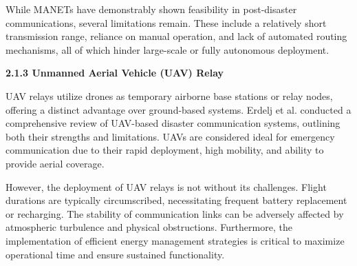             While MANETs have demonstrably shown feasibility in post-disaster communications, several limitations remain. These include a relatively short transmission range, reliance on manual operation, and lack of automated routing mechanisms, all of which hinder large-scale or fully autonomous deployment.

        \vspace{1em}
        \noindent\textbf{2.1.3 Unmanned Aerial Vehicle (UAV) Relay}\par
        \vspace{0.2em}
            UAV relays utilize drones as temporary airborne base stations or relay nodes, offering a distinct advantage over ground-based systems. Erdelj et al. conducted a comprehensive review of UAV-based disaster communication systems, outlining both their strengths and limitations. UAVs are considered ideal for emergency communication due to their rapid deployment, high mobility, and ability to provide aerial coverage.

            However, the deployment of UAV relays is not without its challenges. Flight durations are typically circumscribed, necessitating frequent battery replacement or recharging. The stability of communication links can be adversely affected by atmospheric turbulence and physical obstructions. Furthermore, the implementation of efficient energy management strategies is critical to maximize operational time and ensure sustained functionality.


